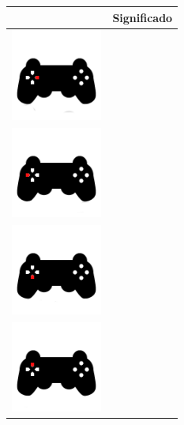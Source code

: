 \begin{table}[H]
  \begin{center}
    \begin{tabular}{|p{3cm}|p{8cm}|}
      \hline
      \centering{Botón} & \qquad \quad Significado \\
     \hline
      \includegraphics[width=3cm]{../imagenes/pad-2.png} & \vspace*{-.8in}{Giro cerrado a la derecha. Orden de giro a la derecha, el vehículo se detiene al soltar la cruceta.} \\
      \hline
      \includegraphics[width=3cm]{../imagenes/pad-4.png} & \vspace*{-.8in}{Giro cerrado a la izquierda. Orden de giro a la izquierda, el vehículo se detiene al soltar la cruceta.} \\
      \hline
       \includegraphics[width=3cm]{../imagenes/pad-3.png} & \vspace*{-.8in}{Retroceder. Orden de movimiento en retroceso, el vehículo se detiene al soltar la cruceta.} \\
      \hline
       \includegraphics[width=3cm]{../imagenes/pad-1.png} & \vspace*{-.8in}{Avanzar. Orden de movimiento hacia delante, el vehículo se detiene al soltar la cruceta.} \\

\end{tabular}
\end{center}
\end{table}
